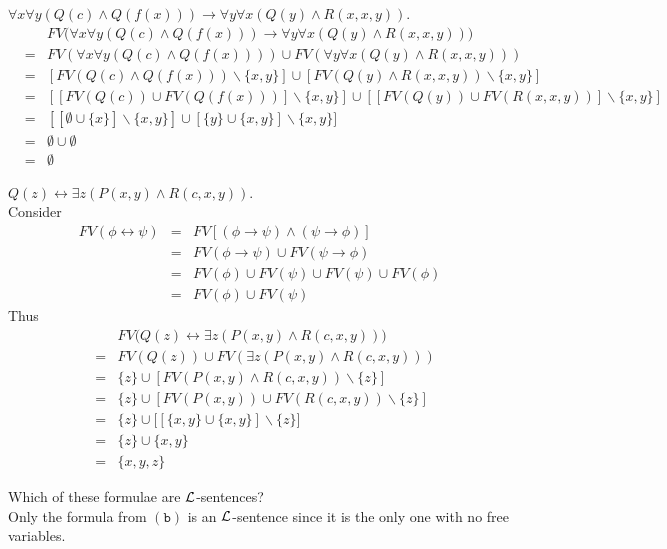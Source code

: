 \documentclass[11pt,a4paper]{article}
\begin{document}
\qpartnb $\forall x\forall y(Q(c)\wedge Q(f(x)))\to\forall y\forall x(Q(y)\wedge R(x,x,y))$.\\

\apartnb
\[\begin{array}{rcl}
&&FV\big(\forall x\forall y(Q(c)\wedge Q(f(x)))\to\forall y\forall x(Q(y)\wedge R(x,x,y))\big)\\
&=&FV(\forall x\forall y(Q(c)\wedge Q(f(x))))\cup FV(\forall y\forall x(Q(y)\wedge R(x,x,y)))\\
&=&[FV(Q(c)\wedge Q(f(x)))\backslash\{x,y\}]\cup[FV(Q(y)\wedge R(x,x,y))\backslash\{x,y\}]\\
&=&[[FV(Q(c))\cup FV(Q(f(x)))]\backslash\{x,y\}]\cup[[FV(Q(y))\cup FV(R(x,x,y))]\backslash\{x,y\}]\\
&=&[[\emptyset\cup\{x\}]\backslash\{x,y\}]\cup[\{y\}\cup\{x,y\}]\backslash\{x,y\}]\\
&=&\emptyset\cup\emptyset\\
&=&\emptyset
\end{array}\]

\qpartnb $Q(z)\longleftrightarrow\exists z(P(x,y)\wedge R(c,x,y))$.\\

\apart
Consider
\[\begin{array}{rcl}
FV(\phi\longleftrightarrow\psi)&=&FV[(\phi\to\psi)\wedge(\psi\to\phi)]\\
&=&FV(\phi\to\psi)\cup FV(\psi\to\phi)\\
&=&FV(\phi)\cup FV(\psi)\cup FV(\psi)\cup FV(\phi)\\
&=&FV(\phi)\cup FV(\psi)
\end{array}\]
Thus
\[\begin{array}{rcl}
&&FV\big(Q(z)\longleftrightarrow\exists z(P(x,y)\wedge R(c,x,y))\big)\\
&=&FV(Q(z))\cup FV(\exists z(P(x,y)\wedge R(c,x,y)))\\
&=&\{z\}\cup[FV(P(x,y)\wedge R(c,x,y))\backslash\{z\}]\\
&=&\{z\}\cup[FV(P(x,y))\cup FV(R(c,x,y))\backslash\{z\}]\\
&=&\{z\}\cup\big[[\{x,y\}\cup\{x,y\}]\backslash\{z\}\big]\\
&=&\{z\}\cup\{x,y\}\\
&=&\{x,y,z\}
\end{array}\]

\qpartnb Which of these formulae are $\mathcal{L}$-sentences?\\

\apartnb Only the formula from $\mathtt{(b)}$ is an $\mathcal{L}$-sentence since it is the only one with no free variables.
\end{document}
